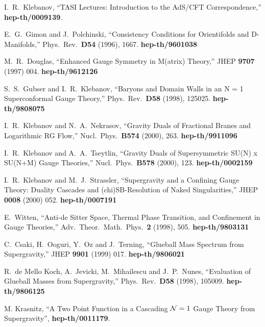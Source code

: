 \documentclass[12pt,epsf,a4paper]{article}
\begin{document}
\begin{thebibliography}{99}
I.~R.~Klebanov,
``TASI Lectures: Introduction to the AdS/CFT Correspondence,''
{\bf hep-th/0009139}.

E.~G.~Gimon and J.~Polchinski,
``Consistency Conditions for Orientifolds and D-Manifolds,''
Phys.\ Rev.\  {\bf D54} (1996), 1667.
{\bf hep-th/9601038}

M.~R.~Douglas,
``Enhanced Gauge Symmetry in M(atrix) Theory,''
JHEP {\bf 9707} (1997) 004.
{\bf hep-th/9612126}

S.~S.~Gubser and I.~R.~Klebanov,
``Baryons and Domain Walls in an N = 1 Superconformal Gauge Theory,''
Phys.\ Rev.\  {\bf D58} (1998), 125025.
{\bf hep-th/9808075}

I.~R.~Klebanov and N.~A.~Nekrasov,
``Gravity Duals of Fractional Branes and Logarithmic RG Flow,''
Nucl.\ Phys.\  {\bf B574} (2000), 263.
{\bf hep-th/9911096}

I.~R.~Klebanov and A.~A.~Tseytlin,
``Gravity Duals of Supersymmetric SU(N) x SU(N+M) Gauge Theories,''
Nucl.\ Phys.\  {\bf B578} (2000), 123.
{\bf hep-th/0002159}

I.~R.~Klebanov and M.~J.~Strassler,
``Supergravity and a Confining Gauge Theory: Duality Cascades and (chi)SB-Resolution 
of Naked Singularities,''
JHEP {\bf 0008} (2000) 052.
{\bf hep-th/0007191}

E.~Witten,
``Anti-de Sitter Space, Thermal Phase Transition, and Confinement in Gauge Theories,''
Adv.\ Theor.\ Math.\ Phys.\  {\bf 2} (1998), 505.
{\bf hep-th/9803131}

C.~Csaki, H.~Ooguri, Y.~Oz and J.~Terning,
``Glueball Mass Spectrum from Supergravity,''
JHEP {\bf 9901} (1999) 017.
{\bf hep-th/9806021}

R.~de Mello Koch, A.~Jevicki, M.~Mihailescu and J.~P.~Nunes,
``Evaluation of Glueball Masses from Supergravity,''
Phys.\ Rev.\  {\bf D58} (1998), 105009.
{\bf hep-th/9806125}

M. Krasnitz, ``A Two Point Function in a Cascading ${\cal N} =1$ Gauge 
Theory from Supergravity'', {\bf hep-th/0011179}.


\end{thebibliography}
\end{document}
